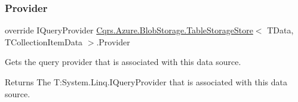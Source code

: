 \subsubsection{\texorpdfstring{Provider}{Provider}}
{\footnotesize\ttfamily override I\+Query\+Provider \hyperlink{classCqrs_1_1Azure_1_1BlobStorage_1_1TableStorageStore}{Cqrs.\+Azure.\+Blob\+Storage.\+Table\+Storage\+Store}$<$ T\+Data, T\+Collection\+Item\+Data $>$.Provider\hspace{0.3cm}{\ttfamily [get]}}



Gets the query provider that is associated with this data source. 

\begin{DoxyReturn}{Returns}
The T\+:\+System.\+Linq.\+I\+Query\+Provider that is associated with this data source. 
\end{DoxyReturn}
